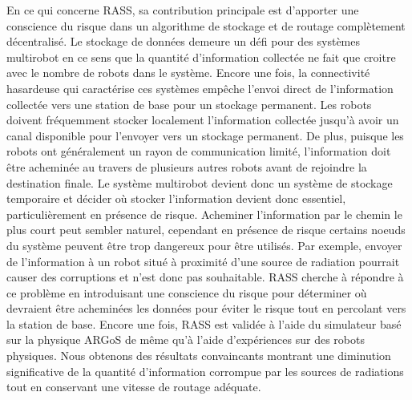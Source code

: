 En ce qui concerne RASS, sa contribution principale est d'apporter une conscience du risque dans un algorithme de stockage et de routage complètement décentralisé. Le stockage de données demeure un défi pour des systèmes multirobot en ce sens que la quantité d'information collectée ne fait que croitre avec le nombre de robots dans le système. Encore une fois, la connectivité hasardeuse qui caractérise ces systèmes \cite{amigoni2017multirobot} empêche l'envoi direct de l'information collectée vers une station de base pour un stockage permanent. Les robots doivent fréquemment stocker localement l'information collectée jusqu'à avoir un canal disponible pour l'envoyer vers un stockage permanent. De plus, puisque les robots ont généralement un rayon de communication limité, l'information doit être acheminée au travers de plusieurs autres robots avant de rejoindre la destination finale. Le système multirobot devient donc un système de stockage temporaire et décider où stocker l'information devient donc essentiel, particulièrement en présence de risque. Acheminer l'information par le chemin le plus court peut sembler naturel, cependant en présence de risque certains noeuds du système peuvent être trop dangereux pour être utilisés. Par exemple, envoyer de l'information à un robot situé à proximité d'une source de radiation pourrait causer des corruptions et n'est donc pas souhaitable. RASS cherche à répondre à ce problème en introduisant une conscience du risque pour déterminer où devraient être acheminées les données pour éviter le risque tout en percolant vers la station de base. Encore une fois, RASS est validée à l'aide du simulateur basé sur la physique ARGoS \cite{Pinciroli:SI2012} de même qu'à l'aide d'expériences sur des robots physiques. Nous obtenons des résultats convaincants montrant une diminution significative de la quantité d'information corrompue par les sources de radiations tout en conservant une vitesse de routage adéquate.
